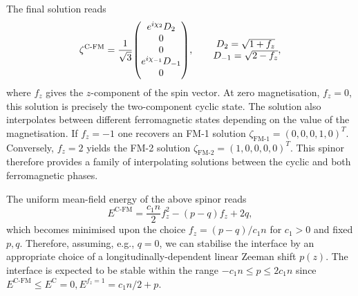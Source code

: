 The final solution reads
\begin{equation}\label{eq: C-FM-interpolating-spinor}
    \zeta^\text{C-FM} = \frac{1}{\sqrt{3}}\mqty(
    e^{i\chi_2}D_2 \\
    0 \\
    0 \\
    e^{i\chi_{-1}}D_{-1} \\
    0
    ), \qquad
    \mqty{
        D_2 = \sqrt{1 + f_z} \\
        D_{-1} = \sqrt{2 - f_z}
    }
    ,
\end{equation}
where \(f_z\) gives the \(z\)-component of the spin vector.
At zero magnetisation, \(f_z = 0\), this solution is precisely the two-component
cyclic state.
The solution also interpolates between different ferromagnetic states depending
on the value of the magnetisation.
If \(f_z = -1\) one recovers an FM-1 solution
\(\zeta_\text{FM-1} = {(0, 0, 0, 1, 0)}^T\).
Conversely, \(f_z = 2\) yields the FM-2 solution
\(\zeta_\text{FM-2} = {(1, 0, 0, 0, 0)}^T\).
This spinor therefore provides a family of interpolating solutions between the
cyclic and both ferromagnetic phases.

The uniform mean-field energy of the above spinor reads
\begin{equation}
    E^\text{C-FM} = \frac{c_1 n}{2} f_z^2 - (p-q)f_z +2q,
\end{equation}
which becomes minimised upon the choice \(f_z = (p-q)/c_1n\) for \(c_1 > 0\) and
fixed \(p, q\).
Therefore, assuming, e.g., \(q=0\), we can stabilise the interface by an
appropriate choice of a longitudinally-dependent linear Zeeman shift \(p(z)\).
The interface is expected to be stable within the range
\(-c_1n \leq p \leq 2c_1n\) since \(E^\text{C-FM} \leq
E^\text{C}=0, E^{f_z=1} = c_1n/2 + p\).

